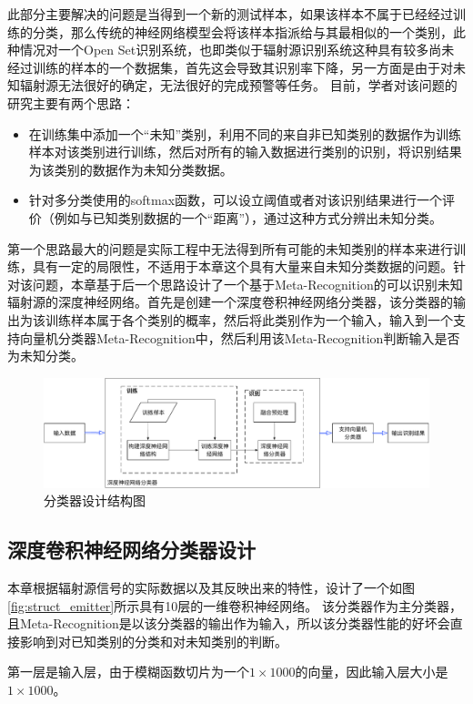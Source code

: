 此部分主要解决的问题是当得到一个新的测试样本，如果该样本不属于已经经过训练的分类，那么传统的神经网络模型会将该样本指派给与其最相似的一个类别，此种情况对一个Open Set识别系统，也即类似于辐射源识别系统这种具有较多尚未经过训练的样本的一个数据集，首先这会导致其识别率下降，另一方面是由于对未知辐射源无法很好的确定，无法很好的完成预警等任务。
目前，学者对该问题的研究主要有两个思路：
\begin{itemize}
	\item 在训练集中添加一个“未知”类别，利用不同的来自非已知类别的数据作为训练样本对该类别进行训练，然后对所有的输入数据进行类别的识别，将识别结果为该类别的数据作为未知分类数据。
	\item 针对多分类使用的softmax函数，可以设立阈值或者对该识别结果进行一个评价（例如与已知类别数据的一个“距离”），通过这种方式分辨出未知分类。
\end{itemize}
第一个思路最大的问题是实际工程中无法得到所有可能的未知类别的样本来进行训练，具有一定的局限性，不适用于本章这个具有大量来自未知分类数据的问题。针对该问题，本章基于后一个思路设计了一个基于Meta-Recognition的可以识别未知辐射源的深度神经网络。首先是创建一个深度卷积神经网络分类器，该分类器的输出为该训练样本属于各个类别的概率，然后将此类别作为一个输入，输入到一个支持向量机分类器Meta-Recognition中，然后利用该Meta-Recognition判断输入是否为未知分类。
\begin{figure}[hbt]
	\centering
	\includegraphics[width=13.5cm]{figures/emitter/frame_emitter}
	\caption{分类器设计结构图}
\end{figure}

\subsection{深度卷积神经网络分类器设计}
本章根据辐射源信号的实际数据以及其反映出来的特性，设计了一个如图\ref{fig:struct_emitter}所示具有10层的一维卷积神经网络。
该分类器作为主分类器，且Meta-Recognition是以该分类器的输出作为输入，所以该分类器性能的好坏会直接影响到对已知类别的分类和对未知类别的判断。

第一层是输入层，由于模糊函数切片为一个$1 \times 1000$的向量，因此输入层大小是$1 \times 1000$。

